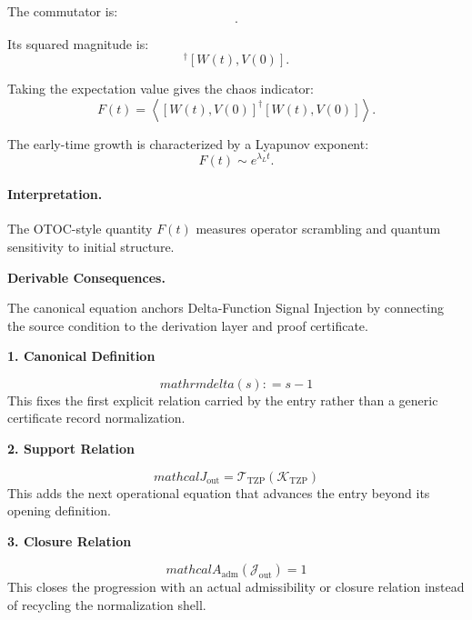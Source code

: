 The commutator is:
\begin{equation}
[W(t),V(0)] .
\end{equation}

Its squared magnitude is:
\begin{equation}
[W(t),V(0)]^\dagger[W(t),V(0)] .
\end{equation}

Taking the expectation value gives the chaos indicator:
\begin{equation}
\boxed{
F(t)
=
\left\langle
[W(t),V(0)]^\dagger
[W(t),V(0)]
\right\rangle .
}
\end{equation}

The early-time growth is characterized by a Lyapunov exponent:
\begin{equation}
F(t)\sim e^{\lambda_L t}.
\end{equation}

\paragraph{Interpretation.}
The OTOC-style quantity $F(t)$ measures operator scrambling and quantum sensitivity to initial structure.

\par\vspace{0.35em}
\noindent\textbf{Derivable Consequences.}\quad
\begingroup
\footnotesize
\raggedright
The canonical equation anchors Delta-Function Signal Injection by connecting the source condition to the derivation layer and proof certificate.
\par\endgroup

\noindent\textbf{1. Canonical Definition}\par
\[
mathrm{delta}(s) : =s-1
\]
\noindent This fixes the first explicit relation carried by the entry rather than a generic certificate record normalization.\par
\noindent\textbf{2. Support Relation}\par
\[
mathcal{J}_{\mathrm{out}} = \mathcal{T}_{\mathrm{TZP}}\!\left(\mathcal{K}_{\mathrm{TZP}}\right)
\]
\noindent This adds the next operational equation that advances the entry beyond its opening definition.\par
\noindent\textbf{3. Closure Relation}\par
\[
mathcal{A}_{\mathrm{adm}}\!\left(\mathcal{J}_{\mathrm{out}}\right)=1
\]
\noindent This closes the progression with an actual admissibility or closure relation instead of recycling the normalization shell.\par

